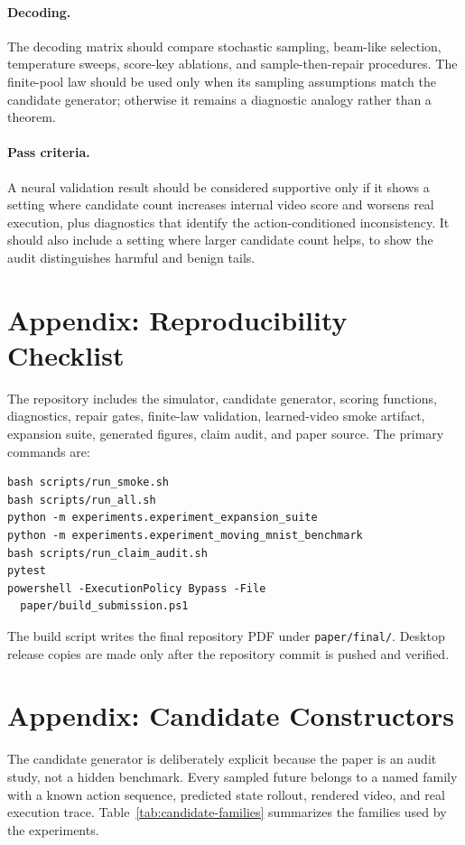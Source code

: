 \documentclass{article}
\begin{document}
\paragraph{Decoding.}
The decoding matrix should compare stochastic sampling, beam-like selection, temperature sweeps, score-key ablations, and sample-then-repair procedures. The finite-pool law should be used only when its sampling assumptions match the candidate generator; otherwise it remains a diagnostic analogy rather than a theorem.

\paragraph{Pass criteria.}
A neural validation result should be considered supportive only if it shows a setting where candidate count increases internal video score and worsens real execution, plus diagnostics that identify the action-conditioned inconsistency. It should also include a setting where larger candidate count helps, to show the audit distinguishes harmful and benign tails.

\section{Appendix: Reproducibility Checklist}
\label{app:checklist}

The repository includes the simulator, candidate generator, scoring functions, diagnostics, repair gates, finite-law validation, learned-video smoke artifact, expansion suite, generated figures, claim audit, and paper source. The primary commands are:
\begin{verbatim}
bash scripts/run_smoke.sh
bash scripts/run_all.sh
python -m experiments.experiment_expansion_suite
python -m experiments.experiment_moving_mnist_benchmark
bash scripts/run_claim_audit.sh
pytest
powershell -ExecutionPolicy Bypass -File
  paper/build_submission.ps1
\end{verbatim}

The build script writes the final repository PDF under \texttt{paper/final/}. Desktop release copies are made only after the repository commit is pushed and verified.

\section{Appendix: Candidate Constructors}
\label{app:candidates}

The candidate generator is deliberately explicit because the paper is an audit study, not a hidden benchmark. Every sampled future belongs to a named family with a known action sequence, predicted state rollout, rendered video, and real execution trace. Table~\ref{tab:candidate-families} summarizes the families used by the experiments.
\end{document}
